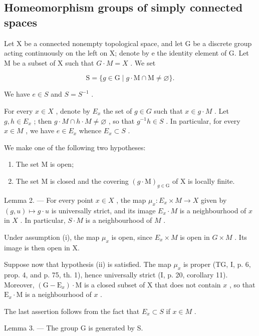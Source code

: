 \subsection{Homeomorphism groups of simply connected spaces}

Let X be a connected nonempty topological space, and let G be a discrete group acting continuously on the left on X; denote by e the identity element of G. Let M be a subset of X such that \(G \cdot M = X\) . We set

\[
\mathrm{S} = \{g \in \mathrm{G} \mid g \cdot \mathrm{M} \cap \mathrm{M} \neq \varnothing \}.
\]

We have \(e \in S\) and \(S = S^{-1}\) .

For every \(x \in X\) , denote by \(E_{x}\) the set of \(g \in G\) such that \(x \in g \cdot M\) . Let \(g, h \in E_{x}\) ; then \(g \cdot M \cap h \cdot M \neq \varnothing\) , so that \(g^{-1}h \in S\) . In particular, for every \(x \in M\) , we have \(e \in E_{x}\) whence \(E_{x} \subset S\) .

We make one of the following two hypotheses:

\begin{enumerate}
\def\labelenumi{(\roman{enumi})}
\item
  The set M is open;
\item
  The set M is closed and the covering \((g \cdot \mathrm{M})_{g \in \mathrm{G}}\) of X is locally finite.
\end{enumerate}

Lemma 2. --- For every point \(x \in X\) , the map \(\mu_x: E_x \times M \to X\) given by \((g, u) \mapsto g \cdot u\) is universally strict, and its image \(E_x \cdot M\) is a neighbourhood of \(x\) in \(X\) . In particular, \(S \cdot M\) is a neighbourhood of \(M\) .

Under assumption (i), the map \(\mu_{x}\) is open, since \(E_{x} \times M\) is open in \(G \times M\) . Its image is then open in X.

Suppose now that hypothesis (ii) is satisfied. The map \(\mu_x\) is proper (TG, I, p. 6, prop. 4, and p. 75, th. 1), hence universally strict (I, p. 20, corollary 11). Moreover, \((\mathrm{G} - \mathrm{E}_x) \cdot \mathrm{M}\) is a closed subset of X that does not contain \(x\) , so that \(\mathrm{E}_x \cdot \mathrm{M}\) is a neighbourhood of \(x\) .

The last assertion follows from the fact that \(E_{x} \subset S\) if \(x \in M\) .

Lemma 3. --- The group G is generated by S.

